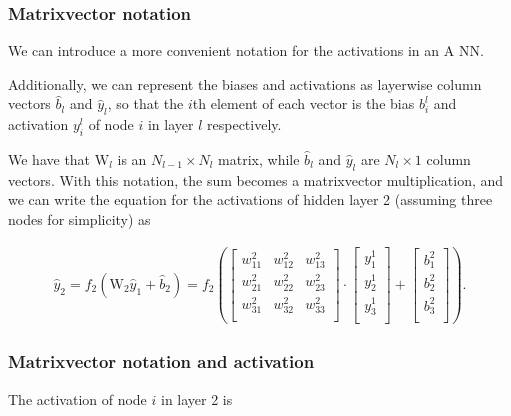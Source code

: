 \documentclass[letterpaper,10pt,english]{sphinxmanual}
\begin{document}
\subsubsection{Matrix\sphinxhyphen{}vector notation}
\label{\detokenize{chapter6:matrix-vector-notation}}
We can introduce a more convenient notation for the activations in an A NN.

Additionally, we can represent the biases and activations
as layer\sphinxhyphen{}wise column vectors \(\hat{b}_l\) and \(\hat{y}_l\), so that the \(i\)\sphinxhyphen{}th element of each vector
is the bias \(b_i^l\) and activation \(y_i^l\) of node \(i\) in layer \(l\) respectively.

We have that \(\mathrm{W}_l\) is an \(N_{l-1} \times N_l\) matrix, while \(\hat{b}_l\) and \(\hat{y}_l\) are \(N_l \times 1\) column vectors.
With this notation, the sum becomes a matrix\sphinxhyphen{}vector multiplication, and we can write
the equation for the activations of hidden layer 2 (assuming three nodes for simplicity) as




\begin{equation*}
\begin{split}
\begin{equation}
 \hat{y}_2 = f_2(\mathrm{W}_2 \hat{y}_{1} + \hat{b}_{2}) = 
 f_2\left(\left[\begin{array}{ccc}
    w^2_{11} &w^2_{12} &w^2_{13} \\
    w^2_{21} &w^2_{22} &w^2_{23} \\
    w^2_{31} &w^2_{32} &w^2_{33} \\
    \end{array} \right] \cdot
    \left[\begin{array}{c}
           y^1_1 \\
           y^1_2 \\
           y^1_3 \\
          \end{array}\right] + 
    \left[\begin{array}{c}
           b^2_1 \\
           b^2_2 \\
           b^2_3 \\
          \end{array}\right]\right).
\label{_auto6} \tag{11}
\end{equation}
\end{split}
\end{equation*}

\subsubsection{Matrix\sphinxhyphen{}vector notation  and activation}
\label{\detokenize{chapter6:matrix-vector-notation-and-activation}}
The activation of node \(i\) in layer 2 is
\end{document}
